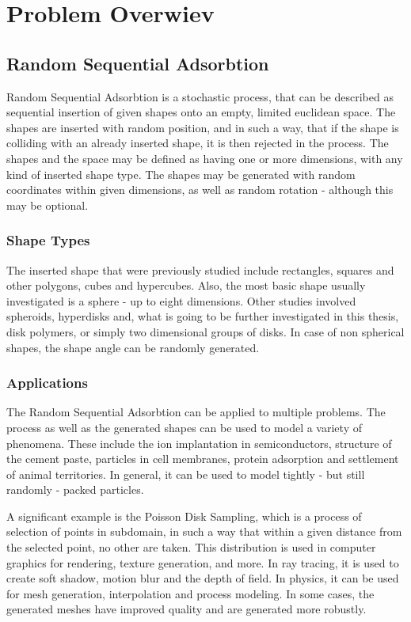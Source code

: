 \documentclass[12pt, oneside]{report}
\begin{document}
\chapter{Problem Overwiev}
\section {Random Sequential Adsorbtion}

Random Sequential Adsorbtion is a stochastic process, that can be described as sequential insertion of given shapes onto an empty, limited euclidean space. The shapes are inserted with random position, and in such a way, that if the shape is colliding with an already inserted shape, it is then rejected in the process. The shapes and the space may be defined as having one or more dimensions, with any kind of inserted shape type. The shapes may be generated with random coordinates within given dimensions, as well as random rotation - although this may be optional.\autocite[1]{zhang}\autocite[1]{feder}

\subsection {Shape Types}

The inserted shape that were previously studied include rectangles, squares and other polygons, cubes and hypercubes. Also, the most basic shape usually investigated is a sphere - up to eight dimensions. Other studies involved spheroids, hyperdisks and, what is going to be further investigated in this thesis, disk polymers, or simply two dimensional groups of disks. In case of non spherical shapes, the shape angle can be randomly generated.\autocite[1]{zhang}

\subsection {Applications}

The Random Sequential Adsorbtion can be applied to multiple problems. The process as well as the generated shapes can be used to model a variety of phenomena. These include the ion implantation in semiconductors, structure of the cement paste, particles in cell membranes, protein adsorption and settlement of animal territories.\autocite[1]{zhang} In general, it can be used to model tightly - but still randomly - packed particles.
\newline

A significant example is the Poisson Disk Sampling, which is a process of selection of points in subdomain, in such a way that within a given distance from the selected point, no other are taken. This distribution is used in computer graphics for rendering, texture generation, and more. In ray tracing, it is used to create soft shadow, motion blur and the depth of field. In physics, it can be used for mesh generation, interpolation and process modeling. In some cases, the generated meshes have improved quality and are generated more robustly. \autocite[1]{ebeida}
\end{document}
